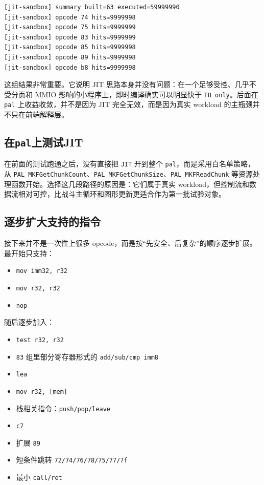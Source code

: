 \documentclass[a4paper]{article}
\begin{document}
\begin{lstlisting}
[jit-sandbox] summary built=63 executed=59999990
[jit-sandbox] opcode 74 hits=9999998
[jit-sandbox] opcode 75 hits=9999999
[jit-sandbox] opcode 83 hits=9999999
[jit-sandbox] opcode 85 hits=9999998
[jit-sandbox] opcode 89 hits=9999998
[jit-sandbox] opcode b8 hits=9999998
\end{lstlisting}

这组结果非常重要。它说明 JIT 思路本身并没有问题：在一个足够受控、几乎不受分页和 MMIO 影响的小程序上，即时编译确实可以明显快于 \texttt{TB only}。后面在 \texttt{pal} 上收益收敛，并不是因为 JIT 完全无效，而是因为真实 workload 的主瓶颈并不只在前端解释层。

\subsection{在\texttt{pal}上测试JIT}
在前面的测试跑通之后，没有直接把 \texttt{JIT} 开到整个 \texttt{pal}，而是采用白名单策略，从 \texttt{PAL\_MKFGetChunkCount}、\texttt{PAL\_MKFGetChunkSize}、\texttt{PAL\_MKFReadChunk} 等资源处理函数开始。选择这几段路径的原因是：它们属于真实 workload，但控制流和数据流相对可控，比战斗主循环和图形更新更适合作为第一批试验对象。

\subsection{逐步扩大支持的指令}
接下来并不是一次性上很多 opcode，而是按“先安全、后复杂”的顺序逐步扩展。最开始只支持：

\begin{itemize}
  \item \texttt{mov imm32, r32}
  \item \texttt{mov r32, r32}
  \item \texttt{nop}
\end{itemize}

随后逐步加入：

\begin{itemize}
  \item \texttt{test r32, r32}
  \item \texttt{83} 组里部分寄存器形式的 \texttt{add/sub/cmp imm8}
  \item \texttt{lea}
  \item \texttt{mov r32, [mem]}
  \item 栈相关指令：\texttt{push/pop/leave}
  \item \texttt{c7}
  \item 扩展 \texttt{89}
  \item 短条件跳转 \texttt{72/74/76/78/75/77/7f}
  \item 最小 \texttt{call/ret}
\end{itemize}
\end{document}
